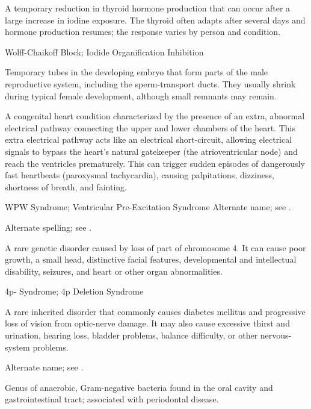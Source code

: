  A temporary reduction in thyroid hormone production that can occur after a large increase in iodine exposure. The thyroid often adapts after several days and hormone production resumes; the response varies by person and condition.

\synonyms
Wolff-Chaikoff Block; Iodide Organification Inhibition

 Temporary tubes in the developing embryo that form parts of the male reproductive system, including the sperm-transport ducts. They usually shrink during typical female development, although small remnants may remain.

 A congenital heart condition characterized by the presence of an extra, abnormal electrical pathway connecting the upper and lower chambers of the heart. This extra electrical pathway acts like an electrical short-circuit, allowing electrical signals to bypass the heart's natural gatekeeper (the atrioventricular node) and reach the ventricles prematurely. This can trigger sudden episodes of dangerously fast heartbeats (paroxysmal tachycardia), causing palpitations, dizziness, shortness of breath, and fainting.

\synonyms
WPW Syndrome; Ventricular Pre-Excitation Syndrome
 Alternate name; see .

 Alternate spelling; see .

 A rare genetic disorder caused by loss of part of chromosome 4. It can cause poor growth, a small head, distinctive facial features, developmental and intellectual disability, seizures, and heart or other organ abnormalities.

\synonyms
4p- Syndrome; 4p Deletion Syndrome

 A rare inherited disorder that commonly causes diabetes mellitus and progressive loss of vision from optic-nerve damage. It may also cause excessive thirst and urination, hearing loss, bladder problems, balance difficulty, or other nervous-system problems.

 Alternate name; see .

 Genus of anaerobic, Gram-negative bacteria found in the oral cavity and gastrointestinal tract; associated with periodontal disease.

